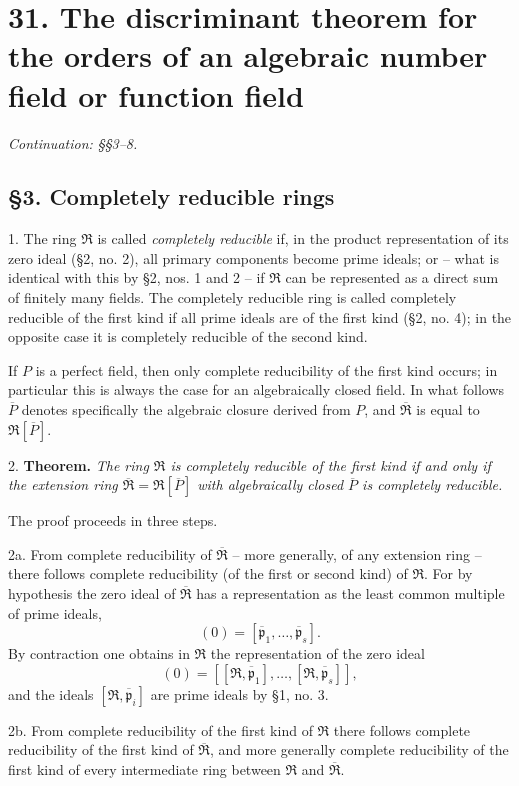 \documentclass[11pt]{article}
\providecommand{\mR}{\mathfrak{R}}
\providecommand{\bR}{\overline{\mathfrak{R}}}
\providecommand{\bP}{\overline{P}}
\providecommand{\bp}{\overline{\mathfrak{p}}}
\begin{document}
\setcounter{footnote}{0}

\section*{31. The discriminant theorem for the orders of an algebraic number field or function field}
\emph{Continuation: §§3--8.}

\subsection*{§3. Completely reducible rings}

1. The ring $\mR$ is called \emph{completely reducible} if, in the product representation of its zero ideal (§2, no. 2), all primary components become prime ideals; or -- what is identical with this by §2, nos. 1 and 2 -- if $\mR$ can be represented as a direct sum of finitely many fields. The completely reducible ring is called completely reducible of the first kind if all prime ideals are of the first kind (§2, no. 4); in the opposite case it is completely reducible of the second kind.

If $P$ is a perfect field, then only complete reducibility of the first kind occurs; in particular this is always the case for an algebraically closed field. In what follows $\bP$ denotes specifically the algebraic closure derived from $P$, and $\bR$ is equal to $\mR[\bP]$.

2. \textbf{Theorem.} \emph{The ring $\mR$ is completely reducible of the first kind if and only if the extension ring $\bR=\mR[\bP]$ with algebraically closed $\bP$ is completely reducible.}

The proof proceeds in three steps.

2a. From complete reducibility of $\bR$ -- more generally, of any extension ring -- there follows complete reducibility (of the first or second kind) of $\mR$. For by hypothesis the zero ideal of $\bR$ has a representation as the least common multiple of prime ideals,
\[
        (0)=[\bp_1,\ldots,\bp_s].
\]
By contraction one obtains in $\mR$ the representation of the zero ideal
\[
        (0)=[[\mR,\bp_1],\ldots,[\mR,\bp_s]],
\]
and the ideals $[\mR,\bp_i]$ are prime ideals by §1, no. 3.

2b. From complete reducibility of the first kind of $\mR$ there follows complete reducibility of the first kind of $\bR$, and more generally complete reducibility of the first kind of every intermediate ring between $\mR$ and $\bR$.
\end{document}
